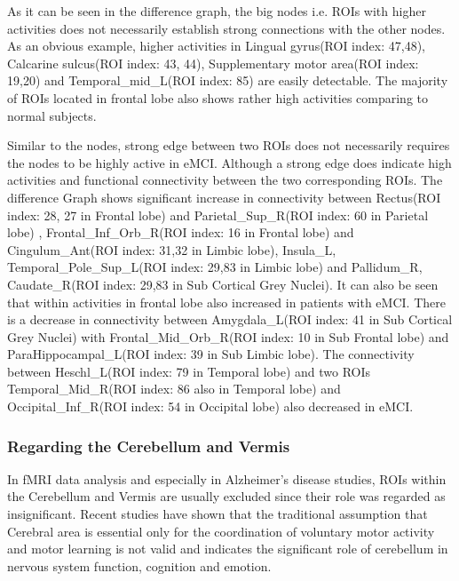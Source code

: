 \documentclass[preprint,12pt]{elsarticle}
\begin{document}
As it can be seen in the difference graph, the big nodes i.e. ROIs with higher activities does not necessarily establish strong connections with the other nodes. As an obvious example, higher activities in Lingual gyrus(ROI index: 47,48)\cite{r24,r25}, Calcarine sulcus(ROI index: 43, 44)\cite{r26,r27}, Supplementary motor area(ROI index: 19,20)\cite{r27,r28} and Temporal\_mid\_L(ROI index: 85)\cite{r29} are easily detectable. The majority of ROIs located in frontal lobe also shows rather high activities comparing to normal subjects\cite{r30,r04}.

Similar to the nodes, strong edge between two ROIs does not necessarily requires the nodes to be highly active in eMCI. Although a strong edge does indicate high activities and functional connectivity between the two corresponding ROIs. The difference Graph shows significant increase in connectivity between 
Rectus(ROI index: 28, 27 in Frontal lobe) and 
Parietal\_Sup\_R(ROI index: 60 in Parietal lobe) \cite{r40, r41},
Frontal\_Inf\_Orb\_R(ROI index: 16 in Frontal lobe) and
Cingulum\_Ant(ROI index: 31,32 in Limbic lobe)\cite{r42},
Insula\_L, Temporal\_Pole\_Sup\_L(ROI index: 29,83 in Limbic lobe) and
Pallidum\_R, Caudate\_R(ROI index: 29,83 in Sub Cortical Grey Nuclei)\cite{r43}. It can also be seen that within activities in frontal lobe also increased in patients with eMCI\cite{r44}. There is a decrease in connectivity between Amygdala\_L(ROI index: 41 in Sub Cortical Grey Nuclei) with Frontal\_Mid\_Orb\_R(ROI index: 10 in Sub Frontal lobe) and ParaHippocampal\_L(ROI index: 39 in Sub Limbic lobe)\cite{r45}. The connectivity between Heschl\_L(ROI index: 79 in Temporal lobe) and two ROIs Temporal\_Mid\_R(ROI index: 86 also in Temporal lobe) and Occipital\_Inf\_R(ROI index: 54 in Occipital lobe) also decreased in eMCI\cite{r46}.  

\subsubsection*{\textbf{Regarding the Cerebellum and Vermis}}
In fMRI data analysis and especially in Alzheimer's disease studies, ROIs within the Cerebellum and Vermis are usually excluded since their role was regarded as insignificant\cite{r47, r48}. Recent studies have shown that the traditional assumption that Cerebral area is essential only for the coordination of voluntary motor activity and motor learning is not valid and indicates the significant role of cerebellum in nervous system function, cognition and emotion\cite{r32}. 
\end{document}
